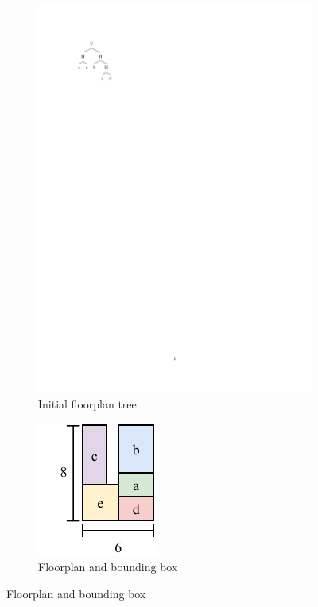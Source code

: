 \documentclass[a4paper, 10pt]{article}
\begin{document}
\begin{figure}[H]
    \centering
    \begin{subfigure}{0.5\textwidth}
        \centering
        \includegraphics[trim=50 670 400 75,clip,width=1\linewidth]{tree1.pdf}
        \caption{Initial floorplan tree}
        \label{}
    \end{subfigure}
    \hspace{10mm}
    \begin{subfigure}{0.4\textwidth}
        \centering
        \includegraphics[trim=13 0 0 0,clip,width=0.6\linewidth]{3_floorplan1.pdf}
        \caption{Floorplan and bounding box}
        \label{}
    \end{subfigure}
\end{figure}
\end{document}
